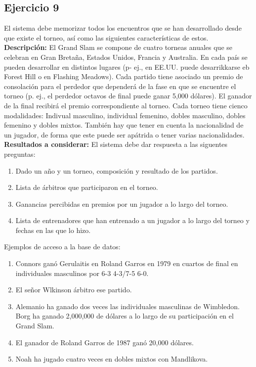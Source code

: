 \documentclass[a4paper, 12pt]{article}
\begin{document}
\begin{justify}
        \subsection{Ejercicio 9}
        \justify
        El sistema debe memorizar todos los encuentros que se han desarrollado desde que existe el torneo, así como las siguientes características de estos.\\
        \textbf{Descripción:} El Grand Slam se compone de cuatro torneas anuales que se celebran en Gran Bretaña, Estados Unidos, Francia y Australia. En cada país se pueden desarrollar en distintos lugares
        (p- ej., en EE.UU. puede desarrikkarse eb Forest Hill o en Flashing Meadows). Cada partido tiene asociado un premio de consolación para el perdedor que dependerá de la fase en que se encuentre el torneo (p. ej., el perdedor octavos de final puede ganar 5,000 dólares).
        El ganador de la final recibirá el premio correspondiente al torneo. Cada torneo tiene cienco modalidades: Indivual masculino, individual femenino, dobles masculino, dobles femenino y dobles mixtos. También hay que tener en cuenta la nacionalidad de un jugador, de forma que
        este puede ser apátrida o tener varias nacionalidades.\\
        \textbf{Resultados a considerar:} El sistema debe dar respuesta a las siguentes preguntas:
        \begin{enumerate}
            \item Dado un año y un torneo, composición y resultado de los partidos.
            \item Lista de árbitros que participaron en el torneo.
            \item Ganancias percibidas en premios por un jugador a lo largo del torneo.
            \item Lista de entrenadores que han entrenado a un jugador a lo largo del torneo y fechas en las que lo hizo.
        \end{enumerate} 
        Ejemplos de acceso a la base de datos:
        \begin{enumerate}
            \item Connors ganó Gerulaitis en Roland Garros en 1979 en cuartos de final en individuales masculinos por 6-3 4-3/7-5 6-0.
            \item El señor Wlkinson árbitro ese partido.
            \item Alemanio ha ganado dos veces las individuales masculinas de Wimbledon. Borg ha ganado 2,000,000 de dólares a lo largo de su participación en el Grand Slam.
            \item El ganador de Roland Garros de 1987 ganó 20,000 dólares.
            \item Noah ha jugado cuatro veces en dobles mixtos con Mandlikova.
        \end{enumerate}

\end{justify}
\end{document}

